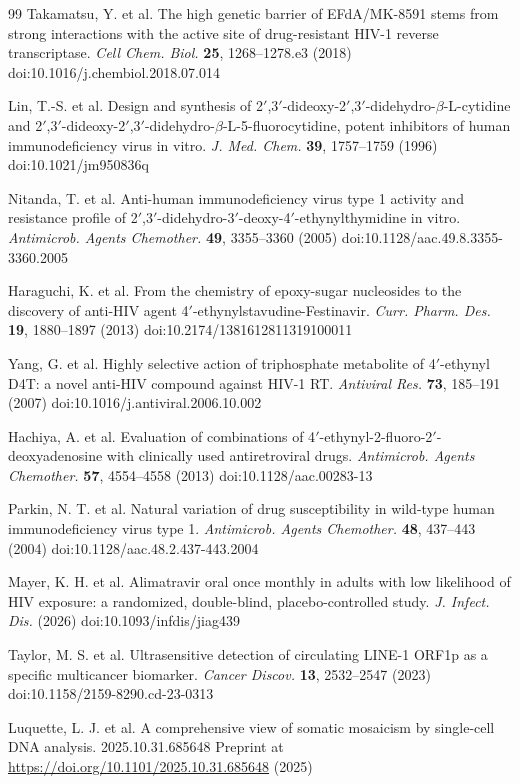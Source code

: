 \documentclass[11pt,twocolumn,twoside]{extarticle}
\begin{document}
\begin{thebibliography}{99}
 Takamatsu, Y. et al. The high genetic barrier of EFdA/MK-8591 stems from strong interactions with the active site of drug-resistant HIV-1 reverse transcriptase. \textit{Cell Chem. Biol.} \textbf{25}, 1268--1278.e3 (2018) doi:10.1016/j.chembiol.2018.07.014

 Lin, T.-S. et al. Design and synthesis of 2$'$,3$'$-dideoxy-2$'$,3$'$-didehydro-$\beta$-L-cytidine and 2$'$,3$'$-dideoxy-2$'$,3$'$-didehydro-$\beta$-L-5-fluorocytidine, potent inhibitors of human immunodeficiency virus in vitro. \textit{J. Med. Chem.} \textbf{39}, 1757--1759 (1996) doi:10.1021/jm950836q

 Nitanda, T. et al. Anti-human immunodeficiency virus type 1 activity and resistance profile of 2$'$,3$'$-didehydro-3$'$-deoxy-4$'$-ethynylthymidine in vitro. \textit{Antimicrob. Agents Chemother.} \textbf{49}, 3355--3360 (2005) doi:10.1128/aac.49.8.3355-3360.2005

 Haraguchi, K. et al. From the chemistry of epoxy-sugar nucleosides to the discovery of anti-HIV agent 4$'$-ethynylstavudine-Festinavir. \textit{Curr. Pharm. Des.} \textbf{19}, 1880--1897 (2013) doi:10.2174/1381612811319100011

 Yang, G. et al. Highly selective action of triphosphate metabolite of 4$'$-ethynyl D4T: a novel anti-HIV compound against HIV-1 RT. \textit{Antiviral Res.} \textbf{73}, 185--191 (2007) doi:10.1016/j.antiviral.2006.10.002

 Hachiya, A. et al. Evaluation of combinations of 4$'$-ethynyl-2-fluoro-2$'$-deoxyadenosine with clinically used antiretroviral drugs. \textit{Antimicrob. Agents Chemother.} \textbf{57}, 4554--4558 (2013) doi:10.1128/aac.00283-13

 Parkin, N. T. et al. Natural variation of drug susceptibility in wild-type human immunodeficiency virus type 1. \textit{Antimicrob. Agents Chemother.} \textbf{48}, 437--443 (2004) doi:10.1128/aac.48.2.437-443.2004

 Mayer, K. H. et al. Alimatravir oral once monthly in adults with low likelihood of HIV exposure: a randomized, double-blind, placebo-controlled study. \textit{J. Infect. Dis.} (2026) doi:10.1093/infdis/jiag439

 Taylor, M. S. et al. Ultrasensitive detection of circulating LINE-1 ORF1p as a specific multicancer biomarker. \textit{Cancer Discov.} \textbf{13}, 2532--2547 (2023) doi:10.1158/2159-8290.cd-23-0313

 Luquette, L. J. et al. A comprehensive view of somatic mosaicism by single-cell DNA analysis. 2025.10.31.685648 Preprint at \url{https://doi.org/10.1101/2025.10.31.685648} (2025)

\end{thebibliography}
\end{document}
